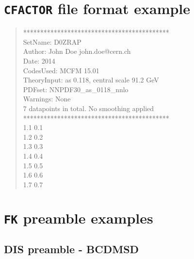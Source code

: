 \documentclass[11pt]{article}
\begin{document}
\clearpage
\section{{\tt CFACTOR} file format example} \label{app:CFACexa}
\begin{quotation}\noindent
*******************************************\\
SetName: D0ZRAP\\
Author: John Doe john.doe@cern.ch \\
Date: 2014\\
CodesUsed: MCFM 15.01\\
TheoryInput: as 0.118, central scale 91.2 GeV\\
PDFset: NNPDF30\_as\_0118\_nnlo\\
Warnings: None\\
7 datapoints in total.
No smoothing applied\\
*******************************************\\
 1.1 0.1\\
 1.2 0.2\\
 1.3 0.3\\
 1.4 0.4\\
 1.5 0.5\\
 1.6 0.6\\
 1.7 0.7 \\
\end{quotation}
\clearpage
\section{{\tt FK} preamble examples} \label{app:FKheaders}
\subsection{DIS preamble - BCDMSD}
\end{document}
